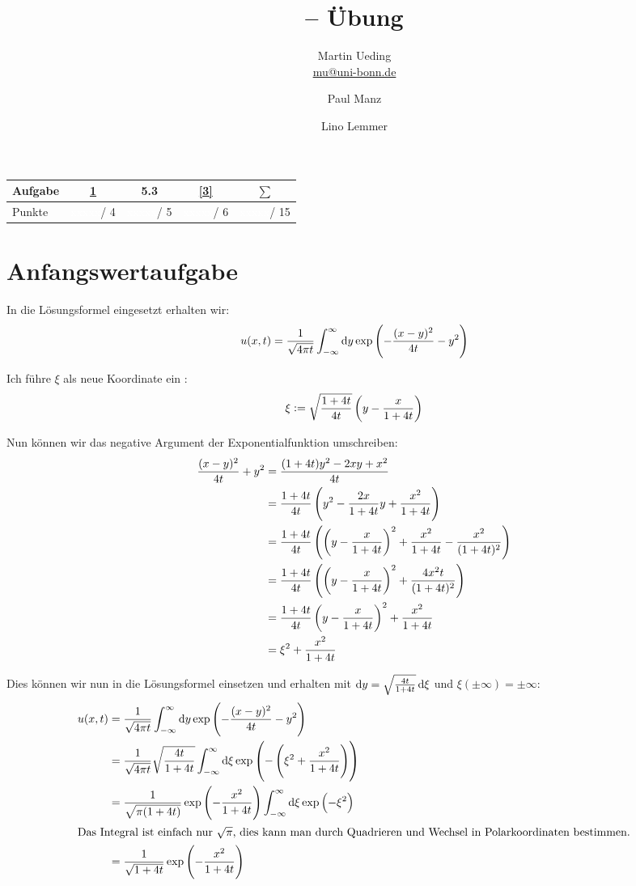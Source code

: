 \documentclass[11pt, ngerman, fleqn]{article}
\title{\themodul{} -- Übung \theuebung \\ \vspace{0.5cm} \large{\thegruppe}}
\author{
	Martin Ueding \\ \small{\href{mailto:mu@uni-bonn.de}{mu@uni-bonn.de}}
	\and
	Paul Manz
	\and
	Lino Lemmer
}
\newcommand{\punkte}{\textcolor{white}{xxxxx}}
\begin{document}
\maketitle

\begin{table}[h]
	\centering
	\begin{tabular}{l|c|c|c|c}
		Aufgabe & \ref{1} & 5.3 & \ref{3} & $\sum$   \\
		\hline
		Punkte & \punkte / 4 & \punkte / 5 & \punkte / 6 & \punkte / 15
	\end{tabular}
\end{table}


\section{Anfangswertaufgabe}
\label{1}

In die Lösungsformel eingesetzt erhalten wir:
\[
	u(x,t) = \frac{1}{\sqrt{4\pi t}} \int_{-\infty}^\infty \dif y \exp\del{
		- \frac{(x-y)^2}{4t} - y^2
	}
\]


Ich führe $\xi$ als neue Koordinate ein \cite{math.se-heat}:
\[
	\xi := \sqrt{\frac{1+4t}{4t}} \del{y-\frac{x}{1+4t}}
\]

Nun können wir das negative Argument der Exponentialfunktion umschreiben:
\begin{align*}
	\frac{(x-y)^2}{4t} + y ^2
	&= \frac{(1+4t) y^2 - 2xy + x^2}{4t} \\
	&= \frac{1+4t}{4t} \del{y^2-\frac{2x}{1+4t}y+\frac{x^2}{1+4t}} \\
	&= \frac{1+4t}{4t} \del{\del{y-\frac{x}{1+4t}}^2+\frac{x^2}{1+4t}-\frac{x^2}{(1+4t)^2}} \\
	&= \frac{1+4t}{4t} \del{\del{y-\frac{x}{1+4t}}^2+\frac{4x^2t}{(1+4t)^2}} \\
	&= \frac{1+4t}{4t} \del{y-\frac{x}{1+4t}}^2 + \frac{x^2}{1+4t} \\
	&= \xi^2 + \frac{x^2}{1+4t}
\end{align*}

Dies können wir nun in die Lösungsformel einsetzen und erhalten mit
$\dif y = \sqrt{\frac{4t}{1+4t}} \dif \xi$ und $\xi(\pm \infty) = \pm \infty$:
\begin{align*}
	u(x,t)
	&= \frac{1}{\sqrt{4\pi t}} \int_{-\infty}^\infty \dif y \exp\del{
		- \frac{(x-y)^2}{4t} - y^2
	} \\
	&= \frac{1}{\sqrt{4\pi t}} \sqrt{\frac{4t}{1+4t}} \int_{-\infty}^\infty \dif \xi \exp\del{
		- \del{\xi^2 + \frac{x^2}{1+4t}}
	} \\
	&= \frac{1}{\sqrt{\pi (1+4t)}} \exp\del{ - \frac{x^2}{1+4t} }
	\int_{-\infty}^\infty \dif \xi
	\exp\del{
		- \xi^2
	} \\
	\intertext{Das Integral ist einfach nur $\sqrt{\pi}$, dies kann man durch Quadrieren und Wechsel in Polarkoordinaten bestimmen.}
	&= \frac{1}{\sqrt{1+4t}} \exp\del{ - \frac{x^2}{1+4t} }
\end{align*}
\end{document}
